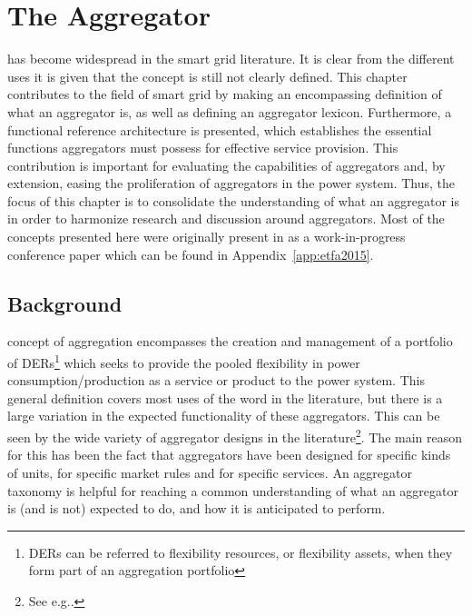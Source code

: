\chapter{The Aggregator} %
\label{cha:aggregator}%
 has become widespread in the smart grid literature. It is clear from the different uses it is given that the concept is still not clearly defined. This chapter contributes to the field of smart grid by making an encompassing definition of what an aggregator is, as well as defining an aggregator lexicon. Furthermore, a functional reference architecture is presented, which establishes the essential functions aggregators must possess for effective service provision. This contribution is important for evaluating the capabilities of aggregators and, by extension, easing the proliferation of aggregators in the power system. Thus, the focus of this chapter is to consolidate the understanding of what an aggregator is in order to harmonize research and discussion around aggregators. Most of the concepts presented here were originally present in as a work-in-progress conference paper which can be found in Appendix~\ref{app:etfa2015}. 

\section{Background}
 concept of aggregation encompasses the creation and management of a portfolio of DERs\footnote{DERs can be referred to flexibility resources, or flexibility assets, when they form part of an aggregation portfolio} which seeks to provide the pooled flexibility in power consumption/production as a service or product to the power system. This general definition covers most uses of the word in the literature, but there is a large variation in the expected functionality of these aggregators. This can be seen by the wide variety of aggregator designs in the literature\footnote{See e.g.\cite{kok2005powermatcher,han2010development,sortomme2011optimal,costanzo2013coordination}.}. The main reason for this has been the fact that aggregators have been designed for specific kinds of units, for specific market rules and for specific services. An aggregator taxonomy is helpful for reaching a common understanding of what an aggregator is (and is not) expected to do, and how it is anticipated to perform.

